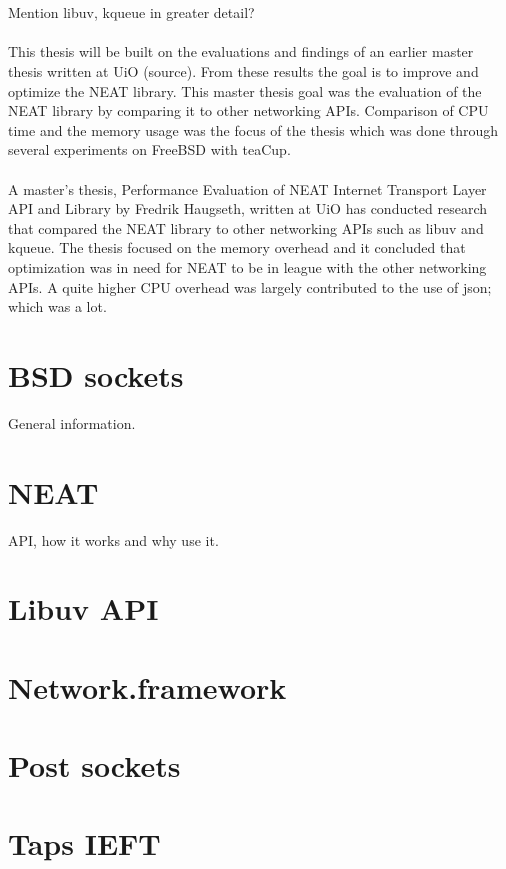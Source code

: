 \documentclass[12pt]{report}
\begin{document}
\\ \\
Mention libuv, kqueue in greater detail? \\ \\
This thesis will be built on the evaluations and findings of an earlier master thesis written at UiO (source). From these results the goal is to improve and optimize the NEAT library. This master thesis goal was the evaluation of the NEAT library by comparing it to other networking APIs. Comparison of CPU time and the memory usage was the focus of the thesis which was done through several experiments on FreeBSD with teaCup. \\
\\
A master's thesis, Performance Evaluation of NEAT Internet Transport Layer API and Library by Fredrik Haugseth, written at UiO has conducted research that compared the NEAT library to other networking APIs such as libuv and kqueue. The thesis focused on the memory overhead and it concluded that optimization was in need for NEAT to be in league with the other networking APIs. A quite higher CPU overhead was largely contributed to the use of json; which was a lot. 

\section{BSD sockets}
General information.

\section{NEAT}
API, how it works and why use it.

\section{Libuv API}

\section{Network.framework}

\section{Post sockets}

\section{Taps IEFT}
\end{document}
